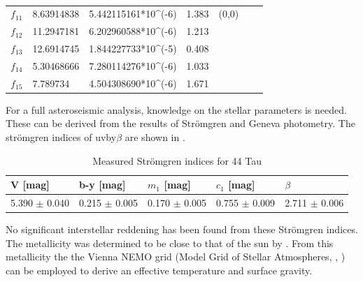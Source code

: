 \begin{table}[htbp]
\begin{tabular}{lllllll}
$f_11$ & 8.63914838              & 5.442115161*10\textasciicircum{}(-6) & 1.383                                                          & (0,0)   &           &                       \\
$f_12$ & 11.2947181              & 6.202960588*10\textasciicircum{}(-6) & 1.213                                                          &         &           &                       \\
$f_13$ & 12.6914745              & 1.844227733*10\textasciicircum{}(-5) & 0.408                                                          &         &           &                       \\
$f_14$ & 5.30468666              & 7.280114276*10\textasciicircum{}(-6) & 1.033                                                          &         &           &                       \\
$f_15$ & 7.789734                & 4.504308690*10\textasciicircum{}(-6) & 1.671                                                          &         &           &                      
\end{tabular}
\caption{}
\label{freqs}
\end{table}

For a full asteroseismic analysis, knowledge on the stellar parameters is needed. These can be derived from the results of Strömgren and Geneva photometry. The strömgren indices of uvby$\beta$ \citep{hauck1997vizier} are shown in .

\begin{table}[htbp]
\begin{tabular}{lllll}
\hline
V {[}mag{]}       & b-y {[}mag{]}     & $m_1$ {[}mag{]}   & $c_1$ {[}mag{]}    & $\beta$           \\ \hline
5.390 $\pm$ 0.040 & 0.215 $\pm$ 0.005 & 0.170 $\pm$ 0.005 & 0.755 $\pm$  0.009 & 2.711 $\pm$ 0.006 \\ \hline
\end{tabular}
\caption{Measured Strömgren indices for 44 Tau}
\label{stromgren}
\end{table}

No significant interstellar reddening has been found from these Strömgren indices. The metallicity was determined to be close to that of the sun by \citet{mcnamara1985relations}. From this metallicity the the Vienna NEMO grid (Model Grid of Stellar Atmospheres, \citet{nendwich2004interpolation}, \citet{heiter2002new}) can be employed to derive an effective temperature and surface gravity.

